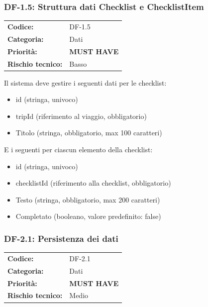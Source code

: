 \documentclass[12pt, a4paper]{article}
\newcommand{\MUST}{\colorbox{musthave}{\small\textbf{MUST HAVE}}}
\newcommand{\RISKL}{\colorbox{risklow}{\small Basso}}
\newcommand{\RISKM}{\colorbox{riskmed}{\small Medio}}
\begin{document}
\subsubsection{DF-1.5: Struttura dati Checklist e ChecklistItem}

\begin{tabular}{@{}ll@{}}
  \toprule
  \textbf{Codice:}          & DF-1.5 \\
  \textbf{Categoria:}       & Dati \\
  \textbf{Priorità:}        & \MUST \\
  \textbf{Rischio tecnico:} & \RISKL \\
  \bottomrule
\end{tabular}

\medskip
\noindent
Il sistema deve gestire i seguenti dati per le checklist:

\begin{itemize}[leftmargin=1.5em, itemsep=1pt]
  \item id (stringa, univoco)
  \item tripId (riferimento al viaggio, obbligatorio)
  \item Titolo (stringa, obbligatorio, max 100 caratteri)
\end{itemize}

\noindent
E i seguenti per ciascun elemento della checklist:

\begin{itemize}[leftmargin=1.5em, itemsep=1pt]
  \item id (stringa, univoco)
  \item checklistId (riferimento alla checklist, obbligatorio)
  \item Testo (stringa, obbligatorio, max 200 caratteri)
  \item Completato (booleano, valore predefinito: false)
\end{itemize}

\subsubsection{DF-2.1: Persistenza dei dati}

\begin{tabular}{@{}ll@{}}
  \toprule
  \textbf{Codice:}          & DF-2.1 \\
  \textbf{Categoria:}       & Dati \\
  \textbf{Priorità:}        & \MUST \\
  \textbf{Rischio tecnico:} & \RISKM \\
  \bottomrule
\end{tabular}
\end{document}

